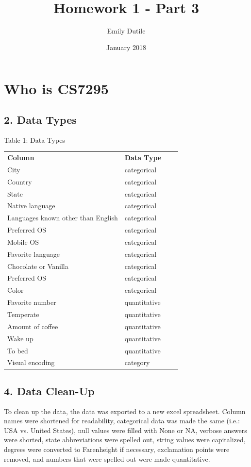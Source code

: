 \documentclass{neu_handout}
\title{Homework 1 - Part 3}
\author{Emily Dutile}
\date{January 2018}
\begin{document}
\section*{Who is CS7295}

\subsection*{2. Data Types}

\begin{center}
Table 1: Data Types
\end{center}
\begin{center} 
\begin{tabular}[h]{l l l l}
\textbf{Column} & \textbf{Data Type} \\
City & categorical \\
Country & categorical \\ 
State & categorical \\
Native language & categorical \\
Languages known other than English & categorical \\
Preferred OS & categorical \\
Mobile OS & categorical \\
Favorite language & categorical \\
Chocolate or Vanilla & categorical \\
Preferred OS & categorical \\
Color & categorical \\
Favorite number & quantitative \\
Temperate & quantitative \\
Amount of coffee & quantitative \\
Wake up & quantitative \\
To bed & quantitative \\
Visual encoding & category
\end{tabular}
\end{center}

\subsection*{4. Data Clean-Up}
To clean up the data, the data was exported to a new excel spreadsheet. Column names were shortened for readability, categorical data was made the same (i.e.: USA vs. United States), null values were filled with None or NA, verbose answers were shorted, state abbreviations were spelled out, string values were capitalized, degrees were converted to Farenheight if necessary, exclamation points were removed, and numbers that were spelled out were made quantitative.\\
\end{document}
